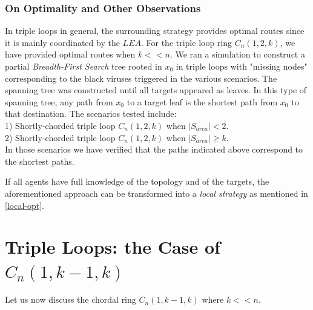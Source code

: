 \subsubsection{On Optimality and Other Observations}
 

 In triple loops in general,  the surrounding strategy  provides optimal routes  since it is mainly coordinated by the $LEA$. For the triple loop ring $C_n(1,2,k)$, we have  provided optimal routes when $k<<n$. We ran a simulation to construct a partial  {\it Breadth-First Search} tree rooted in $x_0$ 
in triple loops  with "missing nodes" corresponding to the black viruses triggered in the various scenarios. The spanning tree was constructed until all targets appeared as leaves. In this type of spanning tree, any path from $x_0$ to a target leaf is the shortest path from $x_0$  to that destination. The scenarios tested include: \\
 1) Shortly-chorded triple loop $C_n(1,2,k)$ when $|S_{area}|<2$.\\
 2) Shortly-chorded triple loop $C_n(1,2,k)$ when $|S_{area}|\ge k$.\\
In those scenarios we have verified that the paths indicated above correspond to the shortest paths.

\medbreak

If all agents have full knowledge of the topology and of the targets, the aforementioned approach can be transformed into a {\em local strategy} as mentioned in \ref{local-opt}.



\section{ Triple Loops:  the Case of  $C_n(1,k-1,k)$}
 Let us now discuss the chordal ring $C_n(1,k-1,k)$ where $k<<n$. 



